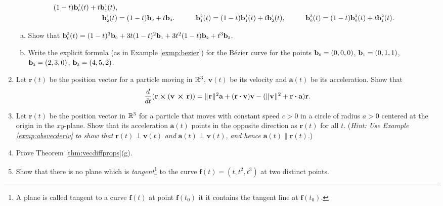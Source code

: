 \begin{enumerate}[\bfseries 1.]
\begin{alignat*}{3}
    ( 1 - t )\textbf{b}_{\scriptscriptstyle 0}^{\scriptscriptstyle 1}(t) + t \textbf{b}_{\scriptscriptstyle 1}^{\scriptscriptstyle 1}(t),
    \\
   \textbf{b}_{\scriptscriptstyle 2}^{\scriptscriptstyle 1}(t) &= ( 1 - t )\textbf{b}_{\scriptscriptstyle 2} + t \textbf{b}_{\scriptscriptstyle 3}.\qquad
    & \textbf{b}_{\scriptscriptstyle 1}^{\scriptscriptstyle 2}(t) &=
    ( 1 - t )\textbf{b}_{\scriptscriptstyle 1}^{\scriptscriptstyle 1}(t) + t \textbf{b}_{\scriptscriptstyle 2}^{\scriptscriptstyle 1}(t),\qquad
    & \textbf{b}_{\scriptscriptstyle 0}^{\scriptscriptstyle 3}(t) &=
    ( 1 - t )\textbf{b}_{\scriptscriptstyle 0}^{\scriptscriptstyle 2}(t) + t \textbf{b}_{\scriptscriptstyle 1}^{\scriptscriptstyle 2}(t).
  \end{alignat*}
  \begin{enumerate}[(a)]
   \item Show that $\textbf{b}_{\scriptscriptstyle 0}^{\scriptscriptstyle 3}(t) = (1 - t)^3 \textbf{b}_{\scriptscriptstyle 0} +
    3t(1 - t)^2 \textbf{b}_{\scriptscriptstyle 1} + 3t^2 (1 - t) \textbf{b}_{\scriptscriptstyle 2} + t^3 \textbf{b}_{\scriptscriptstyle 3}$.
   \item Write the explicit formula (as in Example \ref{exmp:bezier}) for the B\'{e}zier curve for the points
   $\textbf{b}_{\scriptscriptstyle 0} = (0,0,0)$, $\textbf{b}_{\scriptscriptstyle 1} = (0,1,1)$, $\textbf{b}_{\scriptscriptstyle 2} = (2,3,0)$,
   $\textbf{b}_{\scriptscriptstyle 3} = (4,5,2)$.
  \end{enumerate}
\item 
Let $\textbf{r}(t)$ be the position vector for a particle moving in $\mathbb{R}^{3}$,
$\textbf{v}(t)$ be its velocity 
and $\textbf{a}(t)$ be its acceleration.
Show that
  \begin{displaymath}
   \dfrac{d}{dt} ( \textbf{r} \bm{\times} ( \textbf{v}\, \bm{\times} \,\textbf{r} ) ) =
    \lVert\mspace{1mu}\textbf{r}\mspace{1mu}\rVert^2 \textbf{a} + (\textbf{r} \bm{\cdot} \textbf{v}) \textbf{v} -
    (\lVert\mspace{1mu}\textbf{v}\mspace{1mu}\rVert^2 + \textbf{r} \bm{\cdot} \textbf{a})\textbf{r}.
  \end{displaymath} 
\item 
Let $\textbf{r}(t)$ be the position vector in $\mathbb{R}^{3}$ for a particle that moves with constant speed $c > 0$ in a circle of radius $a > 0$ centered at the origin in the $xy$-plane. 
Show that its acceleration $\textbf{a}(t)$ points in the opposite direction as
  $\textbf{r}(t)$ for all $t$. (\emph{Hint: Use Example \ref{exmp:absvecderiv} to show that} $\textbf{r}(t)
  \perp \textbf{v}(t)$ \emph{and} $\textbf{a}(t) \perp \textbf{v}(t)$, \emph{and hence} $\textbf{a}(t) \parallel
  \textbf{r}(t)$.)
 \item Prove Theorem \ref{thm:vecdiffprops}(g).
 
 \item Show that there is no plane which is \emph{tangent}\footnote{A plane is called tangent to a curve $\textbf{f}(t)$ at point $\textbf{f}(t_0)$ it it contains the tangent line at $\textbf{f}(t_0)$.} to the curve $\textbf{f}(t)=(t,t^2,t^3)$ at two distinct points.
\end{enumerate}
\newpage
